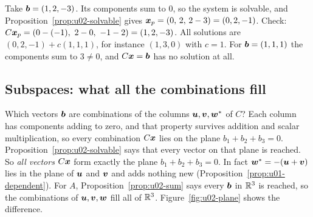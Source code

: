 \begin{example}\label{ex:u02-cyclic}
Take $\boldsymbol{b}=(1,2,-3)$. Its components sum to $0$, so the system is solvable, and
Proposition~\ref{prop:u02-solvable} gives $\boldsymbol{x}_p=(0,\,2,\,2-3)=(0,2,-1)$. Check:
$C\vb{x}_p=(0-(-1),\ 2-0,\ -1-2)=(1,2,-3)$. All solutions are $(0,2,-1)+c(1,1,1)$, for
instance $(1,3,0)$ with $c=1$. For $\boldsymbol{b}=(1,1,1)$ the components sum to $3\neq0$, and
$C\boldsymbol{x}=\boldsymbol{b}$ has no solution at all.
\end{example}

\subsection{Subspaces: what all the combinations fill}

Which vectors $\boldsymbol{b}$ are combinations of the columns $\boldsymbol{u},\boldsymbol{v},\boldsymbol{w}^{*}$ of $C$?
Each column has components adding to zero, and that property survives addition and
scalar multiplication, so every combination $C\boldsymbol{x}$ lies on the plane
$b_1+b_2+b_3=0$. Proposition~\ref{prop:u02-solvable} says that every vector on that plane is
reached. So \emph{all vectors $C\boldsymbol{x}$} form exactly the plane $b_1+b_2+b_3=0$. In fact
$\boldsymbol{w}^{*}=-(\boldsymbol{u}+\boldsymbol{v})$ lies in the plane of $\boldsymbol{u}$ and $\boldsymbol{v}$ and adds nothing
new (Proposition~\ref{prop:u01-dependent}). For $A$, Proposition~\ref{prop:u02-sum} says
every $\boldsymbol{b}$ in $\mathbb{R}^3$ is reached, so the combinations of $\boldsymbol{u},\boldsymbol{v},\boldsymbol{w}$ fill all of
$\mathbb{R}^3$. Figure~\ref{fig:u02-plane} shows the difference.

